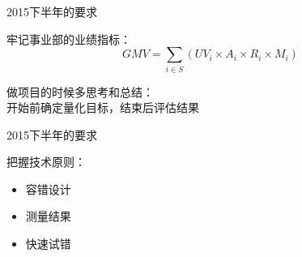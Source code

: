 \documentclass{beamer}
\begin{document}
\begin{CJK}{UTF8}{gbsn}
\begin{frame}{2015下半年的要求}

  牢记事业部的业绩指标：
  $$  GMV = \sum_{i \in S}{(UV_i \times A_i \times R_i \times M_i)} $$

  做项目的时候多思考和总结：\\ 
  开始前确定量化目标，结束后评估结果

\end{frame}

\begin{frame}{2015下半年的要求}

  把握技术原则：
  \begin{itemize}
    \item {容错设计}
    \item {测量结果}
    \item {快速试错}
  \end{itemize}

\end{frame}



\end{CJK}
\end{document}
